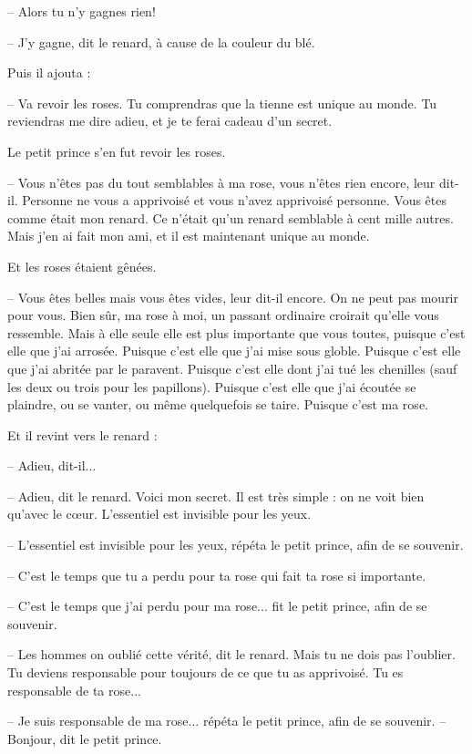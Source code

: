 \documentclass[a4paper]{report}
\begin{document}
-- Alors tu n'y gagnes rien!

-- J'y gagne, dit le renard, à cause de la couleur du blé.

Puis il ajouta :

-- Va revoir les roses. Tu comprendras que la tienne est unique au monde. Tu reviendras me dire adieu, et je te ferai cadeau d'un secret.

Le petit prince s'en fut revoir les roses.

-- Vous n'êtes pas du tout semblables à ma rose, vous n'êtes rien encore, leur dit-il. Personne ne vous a apprivoisé et vous n'avez apprivoisé personne. Vous êtes comme était mon renard. Ce n'était qu'un renard semblable à cent mille autres. Mais j'en ai fait mon ami, et il est maintenant unique au monde.

Et les roses étaient gênées.

-- Vous êtes belles mais vous êtes vides, leur dit-il encore. On ne peut pas mourir pour vous. Bien sûr, ma rose à moi, un passant ordinaire croirait qu'elle vous ressemble. Mais à elle seule elle est plus importante que vous toutes, puisque c'est elle que j'ai arrosée. Puisque c'est elle que j'ai mise sous globle. Puisque c'est elle que j'ai abritée par le paravent. Puisque c'est elle dont j'ai tué les chenilles (sauf les deux ou trois pour les papillons). Puisque c'est elle que j'ai écoutée se plaindre, ou se vanter, ou même quelquefois se taire. Puisque c'est ma rose.

Et il revint vers le renard :

-- Adieu, dit-il...

-- Adieu, dit le renard. Voici mon secret. Il est très simple : on ne voit bien qu'avec le cœur. L'essentiel est invisible pour les yeux.

-- L'essentiel est invisible pour les yeux, répéta le petit prince, afin de se souvenir.

-- C'est le temps que tu a perdu pour ta rose qui fait ta rose si importante.

-- C'est le temps que j'ai perdu pour ma rose... fit le petit prince, afin de se souvenir.

-- Les hommes on oublié cette vérité, dit le renard. Mais tu ne dois pas l'oublier. Tu deviens responsable pour toujours de ce que tu as apprivoisé. Tu es responsable de ta rose...

-- Je suis responsable de ma rose... répéta le petit prince, afin de se souvenir.
\parachapter[XXII]{} %
-- Bonjour, dit le petit prince.
\end{document}
